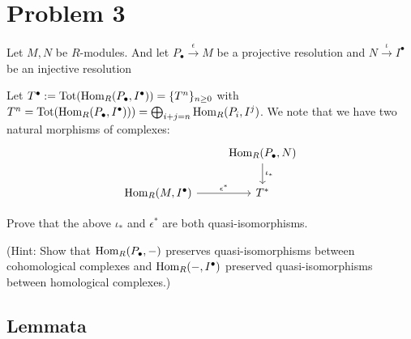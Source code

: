 \section*{Problem 3}

Let \(M, N\) be \(R\)-modules.
And let
\(P_\bullet \xrightarrow{\epsilon} M\) be a projective resolution
and
\(N \xrightarrow{\iota} I^\bullet\) be an injective resolution

Let \(T^\bullet := \textnormal{Tot}(\textnormal{Hom}_R(P_\bullet, I^\bullet)) = \{T^n\}_{n \ge 0}\)
with
\(T^n = \textnormal{Tot}(\textnormal{Hom}_R(P_\bullet, I^\bullet))) = \bigoplus_{i + j = n} \textnormal{Hom}_R(P_i, I^j)\).
We note that we have two natural morphisms of complexes:
\[\begin{tikzcd}
  & \Hom_R(P_\bullet, N) \ar["\iota_*"]{d} \\
  \Hom_R(M, I^\bullet) \ar["\epsilon^*"]{r} & T^*
\end{tikzcd}\]

Prove that the above \(\iota_*\) and \(\epsilon^*\) are both quasi-isomorphisms.

(Hint:
Show that \(\textnormal{Hom}_R(P_\bullet, -)\) preserves quasi-isomorphisms between cohomological complexes
and \(\textnormal{Hom}_R(-, I^\bullet)\) preserved quasi-isomorphisms between
homological complexes.)

\subsection*{Lemmata}

